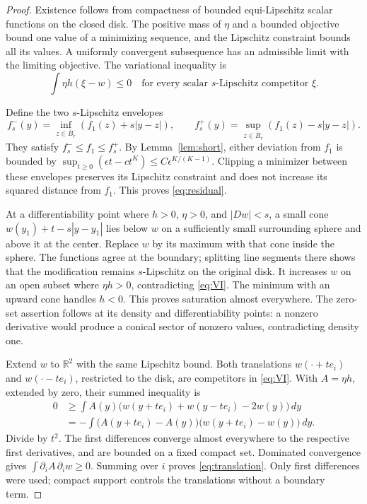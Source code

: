 \documentclass[11pt]{article}
\theoremstyle{remark}
\numberwithin{equation}{section}
\newcommand{\R}{\mathbb R}
\begin{document}
\begin{proof}
Existence follows from compactness of bounded equi-Lipschitz scalar
functions on the closed disk. The positive mass of \(\eta\) and a bounded
objective bound one value of a minimizing sequence, and the Lipschitz
constraint bounds all its values. A uniformly convergent subsequence has
an admissible limit with the limiting objective.
The variational inequality is
\begin{equation}\label{eq:VI}
\int\eta h(\xi-w)\le0
\quad\text{for every scalar \(s\)-Lipschitz competitor \(\xi\).}
\end{equation}

Define the two \(s\)-Lipschitz envelopes
\[
f_s^-(y)=\inf_{z\in\overline B_r}(f_1(z)+s|y-z|),
\qquad
f_s^+(y)=\sup_{z\in\overline B_r}(f_1(z)-s|y-z|).
\]
They satisfy \(f_s^-\le f_1\le f_s^+\).
By Lemma~\ref{lem:short}, either deviation from \(f_1\) is bounded by
\(\sup_{t\ge0}(\epsilon t-ct^K)\le C\epsilon^{K/(K-1)}\).
Clipping a minimizer between these envelopes preserves its Lipschitz
constraint and does not increase its squared distance from \(f_1\).
This proves \eqref{eq:residual}.

At a differentiability point where \(h>0\), \(\eta>0\), and \(|Dw|<s\),
a small cone \(w(y_1)+t-s|y-y_1|\) lies below \(w\) on a sufficiently
small surrounding sphere and above it at the center.
Replace \(w\) by its maximum with that cone inside the sphere.
The functions agree at the boundary; splitting line segments there
shows that the modification remains \(s\)-Lipschitz on the original disk.
It increases \(w\) on an open subset where \(\eta h>0\), contradicting
\eqref{eq:VI}. The minimum with an upward cone handles \(h<0\).
This proves saturation almost everywhere. The zero-set assertion follows
at its density and differentiability points: a nonzero derivative would
produce a conical sector of nonzero values, contradicting density one.

Extend \(w\) to \(\R^2\) with the same Lipschitz bound.
Both translations \(w(\cdot+te_i)\) and \(w(\cdot-te_i)\), restricted
to the disk, are competitors in \eqref{eq:VI}.
With \(A=\eta h\), extended by zero, their summed inequality is
\[
\begin{aligned}
0&\ge\int A(y)\bigl(w(y+te_i)+w(y-te_i)-2w(y)\bigr)\,dy\\
&=-\int\bigl(A(y+te_i)-A(y)\bigr)
          \bigl(w(y+te_i)-w(y)\bigr)\,dy.
\end{aligned}
\]
Divide by \(t^2\). The first differences converge almost everywhere to
the respective first derivatives, and are bounded on a fixed compact set.
Dominated convergence gives \(\int\partial_iA\,\partial_iw\ge0\).
Summing over \(i\) proves \eqref{eq:translation}.
Only first differences were used; compact support controls the translations
without a boundary term.
\end{proof}
\end{document}
